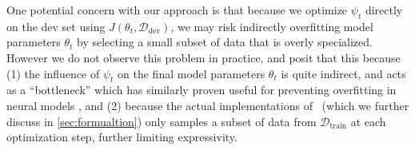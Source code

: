One potential concern with our approach is that because we optimize $\psi_t$ directly on the dev set using $J(\theta_t, \mathcal{D}_\text{dev})$, we may risk indirectly overfitting model parameters $\theta_t$ by selecting a small subset of data that is overly specialized.
However we do not observe this problem in practice, and posit that this because (1) the influence of $\psi_t$ on the final model parameters $\theta_t$ is quite indirect, and acts as a ``bottleneck'' which has similarly proven useful for preventing overfitting in neural models \cite{grezl2007probabilistic}, and (2) because the actual implementations of \dds~(which we further discuss in \autoref{sec:formualtion}) only samples a subset of data from $\mathcal{D}_\text{train}$ at each optimization step, further limiting expressivity.

